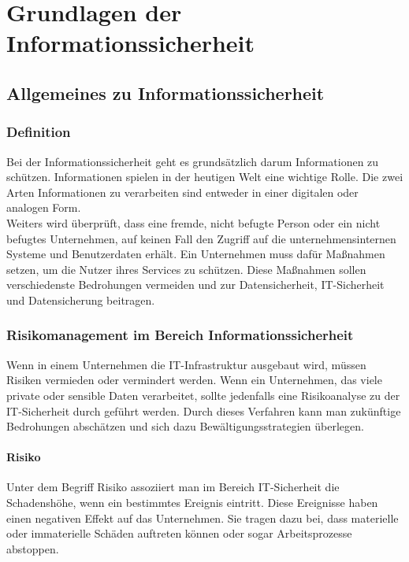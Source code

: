 \chapter{Grundlagen der Informationssicherheit}
\strahlhofer

\section{Allgemeines zu Informationssicherheit}
\subsection{Definition}
Bei der Informationssicherheit geht es grundsätzlich darum Informationen zu schützen. Informationen spielen in der heutigen Welt eine wichtige Rolle. Die zwei Arten Informationen zu verarbeiten sind entweder in einer digitalen oder analogen Form. 
\\
Weiters wird überprüft, dass eine fremde, nicht befugte Person oder ein nicht befugtes Unternehmen, auf keinen Fall den Zugriff auf die unternehmensinternen Systeme und Benutzerdaten erhält. Ein Unternehmen muss dafür Maßnahmen setzen, um die Nutzer ihres Services zu schützen. Diese Maßnahmen sollen verschiedenste Bedrohungen vermeiden und zur Datensicherheit, IT-Sicherheit und Datensicherung beitragen.
\\


\subsection{Risikomanagement im Bereich Informationssicherheit}
Wenn in einem Unternehmen die IT-Infrastruktur ausgebaut wird, müssen Risiken vermieden oder vermindert werden. Wenn ein Unternehmen, das viele private oder sensible Daten verarbeitet, sollte jedenfalls eine Risikoanalyse zu der IT-Sicherheit durch geführt werden. Durch dieses Verfahren kann man zukünftige Bedrohungen abschätzen und sich dazu Bewältigungsstrategien überlegen.

\subsubsection{Risiko}
Unter dem Begriff Risiko assoziiert man im Bereich IT-Sicherheit die Schadenshöhe, wenn ein bestimmtes Ereignis eintritt. Diese Ereignisse haben einen negativen Effekt auf das Unternehmen. Sie tragen dazu bei, dass materielle oder immaterielle Schäden auftreten können oder sogar Arbeitsprozesse abstoppen.

